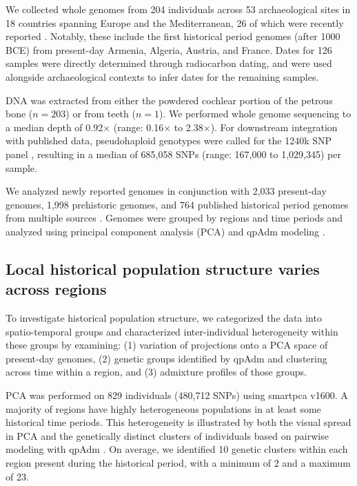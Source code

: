 \documentclass[11pt]{article}
\begin{document}
We collected whole genomes from 204 individuals across 53 archaeological sites in 18 countries spanning Europe and the Mediterranean, 26 of which were recently reported \citep{moots2022}. Notably, these include the first historical period genomes (after 1000 BCE) from present-day Armenia, Algeria, Austria, and France. Dates for 126 samples were directly determined through radiocarbon dating, and were used alongside archaeological contexts to infer dates for the remaining samples.

DNA was extracted from either the powdered cochlear portion of the petrous bone ($n = 203$) or from teeth ($n = 1$). We performed whole genome sequencing to a median depth of 0.92$\times$ (range: 0.16$\times$ to 2.38$\times$). For downstream integration with published data, pseudohaploid genotypes were called for the 1240k SNP panel \citep{mathieson2015}, resulting in a median of 685,058 SNPs (range: 167,000 to 1,029,345) per sample.

We analyzed newly reported genomes in conjunction with 2,033 present-day genomes, 1,998 prehistoric genomes, and 764 published historical period genomes from multiple sources \citep{clemente2021, kovacevic2014, mallick2023, pagani2016, saupe2021, zegarac2021}. Genomes were grouped by regions and time periods and analyzed using principal component analysis (PCA) and qpAdm modeling \citep{haak2015, patterson2012}.

\subsection{Local historical population structure varies across regions}

To investigate historical population structure, we categorized the data into spatio-temporal groups and characterized inter-individual heterogeneity within these groups by examining: (1) variation of projections onto a PCA space of present-day genomes, (2) genetic groups identified by qpAdm and clustering across time within a region, and (3) admixture profiles of those groups.

PCA was performed on 829 individuals (480,712 SNPs) using smartpca v1600. A majority of regions have highly heterogeneous populations in at least some historical time periods. This heterogeneity is illustrated by both the visual spread in PCA and the genetically distinct clusters of individuals based on pairwise modeling with qpAdm \citep{haak2015, harney2021}. On average, we identified 10 genetic clusters within each region present during the historical period, with a minimum of 2 and a maximum of 23.
\end{document}
